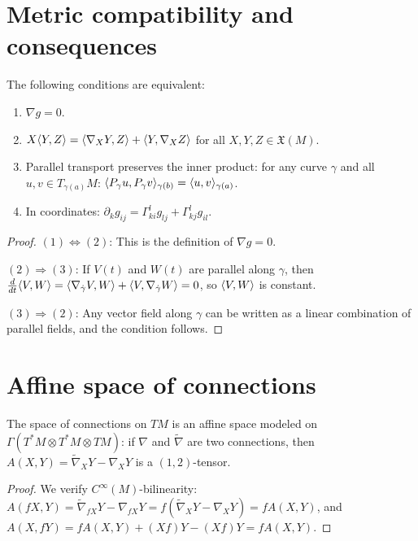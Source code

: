 \section{Metric compatibility and consequences}

\begin{proposition}
The following conditions are equivalent:
\begin{enumerate}
    \item $\nabla g = 0$.
    \item $X \langle Y, Z \rangle = \langle \nabla_X Y, Z \rangle + \langle Y, \nabla_X Z \rangle$
          for all $X, Y, Z \in \mathfrak{X}(M)$.
    \item Parallel transport preserves the inner product: for any curve $\gamma$
          and all $u, v \in T_{\gamma(a)}M$:
          $\langle P_\gamma u, P_\gamma v \rangle_{\gamma(b)} = \langle u, v \rangle_{\gamma(a)}$.
    \item In coordinates: $\partial_k g_{ij} = \Gamma^l_{ki} g_{lj} + \Gamma^l_{kj} g_{il}$.
\end{enumerate}
\end{proposition}

\begin{proof}
$(1) \Leftrightarrow (2)$: This is the definition of $\nabla g = 0$.

$(2) \Rightarrow (3)$: If $V(t)$ and $W(t)$ are parallel along $\gamma$, then
$\frac{d}{dt}\langle V, W \rangle = \langle \nabla_{\dot\gamma}V, W \rangle
+ \langle V, \nabla_{\dot\gamma}W \rangle = 0$, so $\langle V, W \rangle$ is constant.

$(3) \Rightarrow (2)$: Any vector field along $\gamma$ can be written as a
linear combination of parallel fields, and the condition follows.
\end{proof}

\section{Affine space of connections}

\begin{proposition}
The space of connections on $TM$ is an affine space modeled on
$\Gamma(T^*M \otimes T^*M \otimes TM)$: if $\nabla$ and $\tilde{\nabla}$ are
two connections, then $A(X,Y) = \tilde{\nabla}_X Y - \nabla_X Y$ is a
$(1,2)$-tensor.
\end{proposition}

\begin{proof}
We verify $C^\infty(M)$-bilinearity:
$A(fX, Y) = \tilde{\nabla}_{fX}Y - \nabla_{fX}Y = f(\tilde{\nabla}_X Y - \nabla_X Y) = fA(X,Y)$,
and $A(X, fY) = fA(X,Y) + (Xf)Y - (Xf)Y = fA(X,Y)$.
\end{proof}


